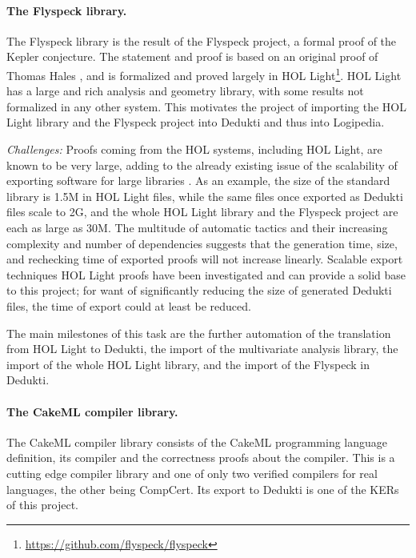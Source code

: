 \paragraph*{The Flyspeck library.}

The Flyspeck library
is the result of the Flyspeck
project, a formal proof of the Kepler conjecture. The statement and
proof is based on an original proof of Thomas Hales
\cite{DBLP:journals/corr/HalesABDHHKMMNNNOPRSTTTUVZ15}, and is
formalized and proved largely in HOL
Light\footnote{\url{https://github.com/flyspeck/flyspeck}}. HOL Light
has a large and rich analysis and geometry library, with some results
not formalized in any other system. This motivates the project of
importing the HOL Light library and the Flyspeck project into
Dedukti and thus into Logipedia.

\emph{Challenges:}
Proofs coming from the HOL systems, including {HOL Light}, are known to
be very large, adding to the already existing issue of the scalability of
exporting software for large libraries
\cite{DBLP:conf/tphol/Wong95,DBLP:conf/cade/ObuaS06,DBLP:conf/itp/KellerW10,
DBLP:conf/cade/Kumar13}. As an example, the size of the standard library is
1.5M in {HOL Light} files, while the same files once
exported as {Dedukti} files scale to 2G, and the whole
{HOL Light} library and the {Flyspeck} project are each as
large as 30M. The multitude of automatic tactics and their increasing
complexity and number of dependencies suggests that the generation time, size,
and rechecking time of exported proofs will not increase linearly. Scalable
export techniques {HOL Light} proofs have been investigated
\cite{KaliszykK13} and can provide a solid base to
this project; for want of significantly reducing the size of generated
{Dedukti} files, the time of export could at least be reduced.

The main milestones of this task are the further automation of the
translation from {HOL Light} to {Dedukti}, the import of the
multivariate analysis library, the import of the whole {HOL Light}
library, and the import of the {Flyspeck} in {Dedukti}.

\paragraph*{The CakeML compiler library.}

The CakeML compiler library consists of the CakeML programming language
definition, its compiler and the correctness proofs about the
compiler. This is a cutting edge compiler library and one of only two
verified compilers for real languages, the other being CompCert. Its
export to Dedukti is one of the KERs of this project.

